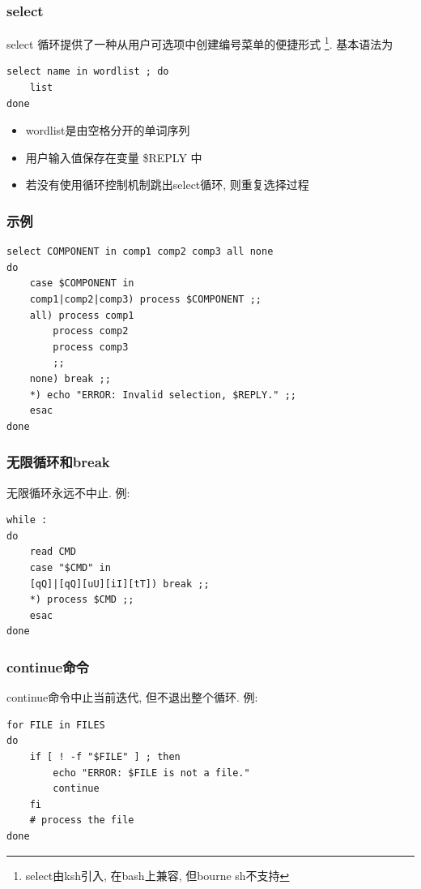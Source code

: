 \documentclass[compress]{beamer}
\begin{document}
\begin{frame}[fragile]
\frametitle{select}

select 循环提供了一种从用户可选项中创建编号菜单的便捷形式
\footnote{select由ksh引入, 在bash上兼容, 但bourne sh不支持}. 基本语法为\\
{ \small
\begin{Verbatim}
select name in wordlist ; do
    list
done
\end{Verbatim}
}

\begin{itemize}
\item wordlist是由空格分开的单词序列
\item 用户输入值保存在变量 \$REPLY 中
\item 若没有使用循环控制机制跳出select循环, 则重复选择过程
\end{itemize}
\end{frame}

\begin{frame}[fragile]
\frametitle{示例}

\begin{lstlisting}
select COMPONENT in comp1 comp2 comp3 all none
do
    case $COMPONENT in
    comp1|comp2|comp3) process $COMPONENT ;;
    all) process comp1
        process comp2
        process comp3
        ;;
    none) break ;;
    *) echo "ERROR: Invalid selection, $REPLY." ;;
    esac
done
\end{lstlisting}
\end{frame}

\begin{frame}[fragile]
\frametitle{无限循环和break}

无限循环永远不中止. 例: \\
\begin{lstlisting}
while :
do
    read CMD
    case "$CMD" in
    [qQ]|[qQ][uU][iI][tT]) break ;;
    *) process $CMD ;;
    esac
done
\end{lstlisting}
\end{frame}

\begin{frame}[fragile]
\frametitle{continue命令}

continue命令中止当前迭代, 但不退出整个循环.  例: \\

\begin{lstlisting}
for FILE in FILES
do
    if [ ! -f "$FILE" ] ; then
        echo "ERROR: $FILE is not a file."
        continue
    fi
    # process the file
done
\end{lstlisting}
\end{frame}
\end{document}
